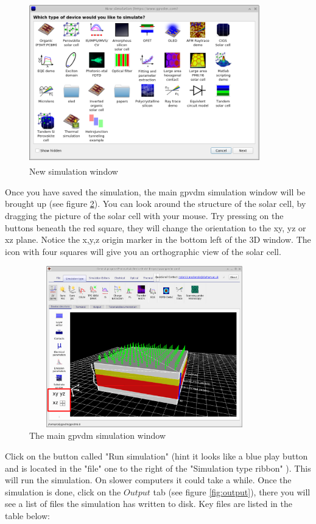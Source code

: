 \begin{figure}[H]
\centering
\includegraphics[width=100mm,height=70mm]{./images/new.png}
\caption{New simulation window}
\label{fig:new_new}
\end{figure}

Once you have saved the simulation, the main gpvdm simulation window will be brought up (see figure \ref{fig:simple_interface}). You can look around the structure of the solar cell, by dragging the picture of the solar cell with your mouse.  Try pressing on the buttons beneath the red square, they will change the orientation to the xy, yz or xz plane. Notice the x,y,z origin marker in the bottom left of the 3D window.  The icon with four squares will give you an orthographic view of the solar cell.


\begin{figure}[H]
\centering
\includegraphics[width=100mm,height=70mm]{./images/simple_interface.png}
\caption{The main gpvdm simulation window}
\label{fig:simple_interface}
\end{figure}

Click on the button called "Run simulation" (hint it looks like a blue play button and is located in the "file" one to the right of the "Simulation type ribbon" ).  This will run the simulation.  On slower computers it could take a while. Once the simulation is done, click on the $Output$ tab (see figure \ref{fig:output}), there you will see a list of files the simulation has written to disk. Key files are listed in the table below:

